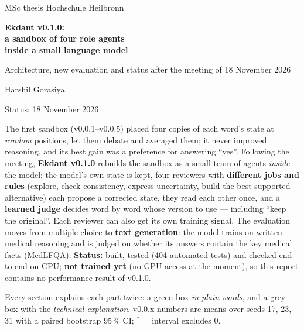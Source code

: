 \documentclass[a4paper,12pt,parskip=half,headsepline]{scrartcl}
\newcommand{\sig}{\ensuremath{^{\ast}}}
\begin{document}
\begin{titlepage}
  \thispagestyle{empty}
  \vspace*{0.6cm}
  {\color{muted}\large\sffamily MSc thesis \textbullet{} Hochschule Heilbronn}\par
  \vspace{0.6cm}
  {\color{ink}\fontsize{25}{30}\selectfont\sffamily\bfseries Ekdant v0.1.0:\\[3pt] a sandbox of four role agents\\[3pt] inside a small language model\par}
  \vspace{0.6cm}
  {\Large\sffamily\color{lblue} Architecture, new evaluation and status after the meeting of 18 November 2026\par}
  \vspace{0.7cm}
  \par
  \vspace{0.5cm}
  {\large\sffamily Harshil Gorasiya\par}
  \vspace{0.2cm}
  {\sffamily\color{muted} Status: 18 November 2026\par}
  \vfill
  \begin{keybox}[title={In one paragraph}]
  \small
  The first sandbox (v0.0.1--v0.0.5) placed four copies of each word's state at
  \emph{random} positions, let them debate and averaged them; it never improved
  reasoning, and its best gain was a preference for answering ``yes''.
  Following the meeting, \textbf{Ekdant v0.1.0} rebuilds the sandbox as a small team
  of agents \emph{inside} the model: the model's own state is kept, four reviewers
  with \textbf{different jobs and rules} (explore, check consistency, express
  uncertainty, build the best-supported alternative) each propose a corrected
  state, they read each other once, and a \textbf{learned judge} decides word by
  word whose version to use --- including ``keep the original''. Each reviewer can
  also get its own training signal. The evaluation moves from multiple choice to
  \textbf{text generation}: the model trains on written medical reasoning and is
  judged on whether its answers contain the key medical facts (MedLFQA).
  \textbf{Status:} built, tested (404 automated tests) and checked end-to-end on
  CPU; \textbf{not trained yet} (no GPU access at the moment), so this report
  contains no performance result of v0.1.0.
  \end{keybox}
  \vspace{0.3cm}
  {\footnotesize\color{muted} Every section explains each part twice: a green box \emph{in plain words}, and a grey box with the \emph{technical explanation}. v0.0.x numbers are means over seeds 17, 23, 31 with a paired bootstrap 95\,\% CI; \sig{} = interval excludes 0.\par}
\end{titlepage}
\end{document}
